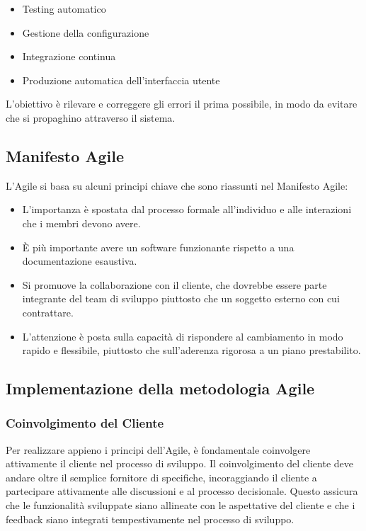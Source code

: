 \begin{itemize}
    \item Testing automatico
    \item Gestione della configurazione
    \item Integrazione continua
    \item Produzione automatica dell'interfaccia utente
\end{itemize}

L'obiettivo è rilevare e correggere gli errori il prima possibile, in modo da evitare che si propaghino attraverso il sistema.

\subsection{Manifesto Agile}
L'Agile si basa su alcuni principi chiave che sono riassunti nel Manifesto Agile:

\begin{itemize}
    \item L'importanza è spostata dal processo formale all'individuo e alle interazioni
    che i membri devono avere.
    \item È più importante avere un software funzionante rispetto a una documentazione esaustiva.
    \item Si promuove la collaborazione con il cliente, che dovrebbe essere parte integrante
    del team di sviluppo piuttosto che
    un soggetto esterno con cui contrattare.
    \item L'attenzione è posta sulla capacità di rispondere al cambiamento in modo rapido e flessibile, piuttosto che
    sull'aderenza rigorosa a un piano prestabilito.
\end{itemize}

\subsection{Implementazione della metodologia Agile}
\subsubsection{Coinvolgimento del Cliente}
Per realizzare appieno i principi dell'Agile, è fondamentale coinvolgere attivamente il cliente nel processo di sviluppo.
Il coinvolgimento del cliente deve andare oltre il semplice fornitore di specifiche, incoraggiando il cliente a partecipare
attivamente alle discussioni e al processo decisionale. Questo assicura che le funzionalità sviluppate siano allineate con
le aspettative del cliente e che i feedback siano integrati tempestivamente nel processo di sviluppo.

